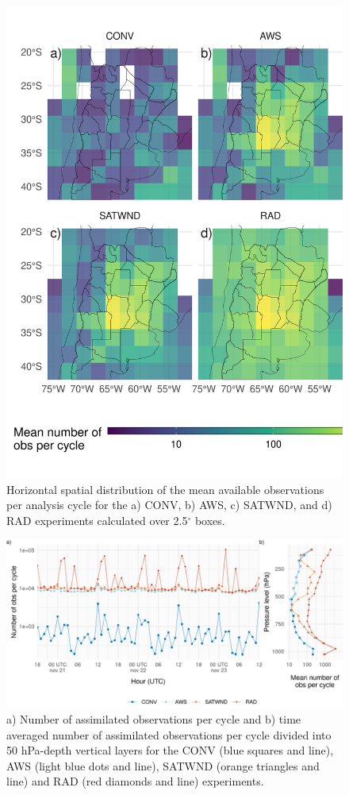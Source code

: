 \documentclass[preprint, 3p, authoryear,review, 12pt]{elsarticle} %
\begin{document}
\begin{figure}
\includegraphics[width=1\linewidth]{../figures/obs-horizontal-1} \caption{Horizontal spatial distribution of the mean available observations per analysis cycle for the a) CONV, b) AWS, c) SATWND, and d) RAD experiments calculated over 2.5\(^{\circ}\) boxes.}\label{fig:obs-horizontal}
\end{figure}



\begin{figure}
\includegraphics{../figures/obs-cycle-1} \caption{a) Number of assimilated observations per cycle and b) time averaged number of assimilated observations per cycle divided into 50 hPa-depth vertical layers for the CONV (blue squares and line), AWS (light blue dots and line), SATWND (orange triangles and line) and RAD (red diamonds and line) experiments.}\label{fig:obs-cycle}
\end{figure}
\end{document}
